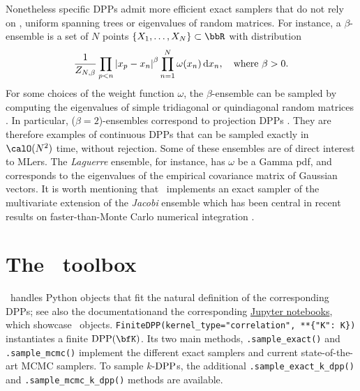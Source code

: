 \documentclass[twoside,11pt]{article}
\begin{document}
        Nonetheless specific DPPs admit more efficient exact samplers that do not rely on , \eg uniform spanning trees \citep{PrWi98} or eigenvalues of random matrices.
        For instance, a $\beta$-ensemble is a set of $N$ points $\{X_1,\dots,X_N\}\subset \bbR$ with distribution
        \setlength{\belowdisplayskip}{0pt} \setlength{\belowdisplayshortskip}{0pt}
\setlength{\abovedisplayskip}{0pt} \setlength{\abovedisplayshortskip}{0pt}
        \begin{equation*}
        \label{eq:beta_ensemble_pdf}
        \frac{1}{Z_{N,\beta}}
        \prod_{p< n}
            \left| x_p-x_n \right|^{\beta}
        \prod_{n= 1}^N
            \omega(x_n)
            \mathop{}\!\mathrm{d} x_n, \quad \text{where } \beta>0.
        \end{equation*}
        For some choices of the weight function $\omega$, the $\beta$-ensemble can be sampled by computing the eigenvalues of simple tridiagonal \citep{DuEd02} or quindiagonal random matrices \citep{KiNe04}.
        In particular, ($\beta=2$)-ensembles correspond to projection DPPs \citep{Kon05}.
        They are therefore examples of continuous DPPs that can be sampled exactly in $\calO(N^2)$ time, without rejection.
        Some of these ensembles are of direct interest to MLers.
        The \emph{Laguerre} ensemble, for instance, has $\omega$ be a Gamma pdf, and corresponds to the eigenvalues of the empirical covariance matrix of \iid Gaussian vectors.
        It is worth mentioning that \DPPy\ implements an exact sampler of the  multivariate extension of the \emph{Jacobi} ensemble which has been central in recent results on faster-than-Monte Carlo numerical integration \citep{BaHa16,GaBaVa19,MaCoAm19}.



\section{The \DPPy\ toolbox} %
\label{sec:the_dppy_toolbox}

    \lstset{language=mypython}

    \DPPy\ handles Python objects that fit the natural definition of the corresponding DPPs; see also the documentationand the corresponding \href{https://github.com/guilgautier/DPPy/tree/master/notebooks}{Jupyter notebooks}, which showcase \DPPy\ objects.
    \lstinline!FiniteDPP(kernel_type="correlation", **{"K": K})!\!
    instantiates a finite $\DPP(\bfK)$.
    Its two main methods,
    \lstinline{.sample_exact()} and
    \lstinline{.sample_mcmc()}
    implement the different exact samplers and current state-of-the-art MCMC samplers.
    To sample $k$-$\operatorname{DPP}$s, the additional
    \lstinline{.sample_exact_k_dpp()} and
    \lstinline{.sample_mcmc_k_dpp()} methods are available.
\end{document}
